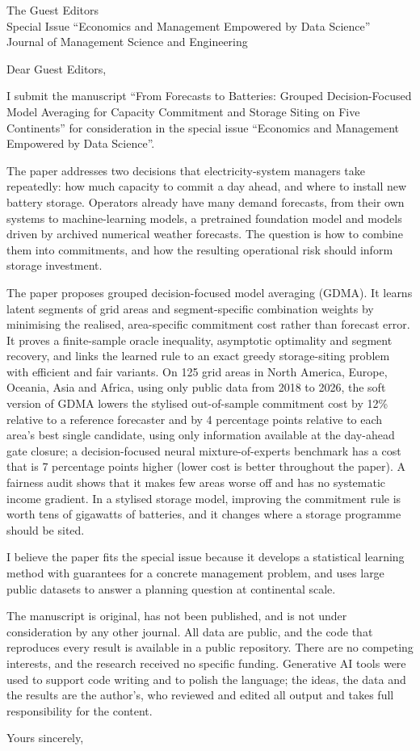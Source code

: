 \documentclass[11pt]{letter}
\date{\today}
\begin{document}
\begin{letter}{The Guest Editors\\Special Issue ``Economics and Management Empowered by Data Science''\\Journal of Management Science and Engineering}

\opening{Dear Guest Editors,}

I submit the manuscript ``From Forecasts to Batteries: Grouped Decision-Focused Model Averaging for Capacity Commitment and Storage Siting on Five Continents'' for consideration in the special issue ``Economics and Management Empowered by Data Science''.

The paper addresses two decisions that electricity-system managers take repeatedly: how much capacity to commit a day ahead, and where to install new battery storage. Operators already have many demand forecasts, from their own systems to machine-learning models, a pretrained foundation model and models driven by archived numerical weather forecasts. The question is how to combine them into commitments, and how the resulting operational risk should inform storage investment.

The paper proposes grouped decision-focused model averaging (GDMA). It learns latent segments of grid areas and segment-specific combination weights by minimising the realised, area-specific commitment cost rather than forecast error. It proves a finite-sample oracle inequality, asymptotic optimality and segment recovery, and links the learned rule to an exact greedy storage-siting problem with efficient and fair variants. On 125 grid areas in North America, Europe, Oceania, Asia and Africa, using only public data from 2018 to 2026, the soft version of GDMA lowers the stylised out-of-sample commitment cost by 12\% relative to a reference forecaster and by 4 percentage points relative to each area's best single candidate, using only information available at the day-ahead gate closure; a decision-focused neural mixture-of-experts benchmark has a cost that is 7 percentage points higher (lower cost is better throughout the paper). A fairness audit shows that it makes few areas worse off and has no systematic income gradient. In a stylised storage model, improving the commitment rule is worth tens of gigawatts of batteries, and it changes where a storage programme should be sited.

I believe the paper fits the special issue because it develops a statistical learning method with guarantees for a concrete management problem, and uses large public datasets to answer a planning question at continental scale.

The manuscript is original, has not been published, and is not under consideration by any other journal. All data are public, and the code that reproduces every result is available in a public repository. There are no competing interests, and the research received no specific funding. Generative AI tools were used to support code writing and to polish the language; the ideas, the data and the results are the author's, who reviewed and edited all output and takes full responsibility for the content.

\closing{Yours sincerely,}

\end{letter}
\end{document}
